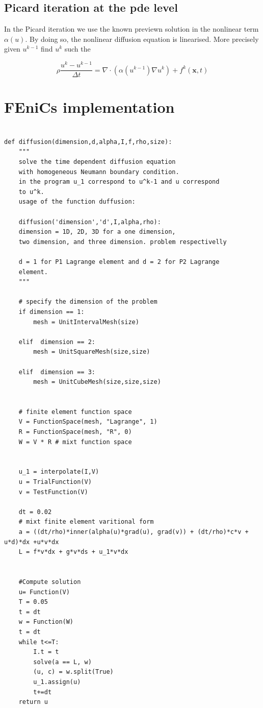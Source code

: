 \documentclass[10pt,a4paper]{report}
\begin{document}
\subsection{Picard iteration at the pde level}
In the Picard iteration we use the known previewn solution in the nonlinear term $\alpha (u)$. By doing so, the nonlinear diffusion equation is linearised. More precisely given $u^{k-1}$ find $u^{k}$ such the 


\begin{equation}\label{spatialp}
\rho\frac{u^{k}-u^{k-1}}{\Delta t} = \nabla\cdot(\alpha (u^{k-1})\nabla u^{k}) + f^{k}(\textbf{x},t)
\end{equation}

\clearpage
\section{FEniCs implementation}

\begin{lstlisting}

def diffusion(dimension,d,alpha,I,f,rho,size):
    """
    solve the time dependent diffusion equation
    with homogeneous Neumann boundary condition.
    in the program u_1 correspond to u^k-1 and u correspond
    to u^k.
    usage of the function duffusion:
    
    diffusion('dimension','d',I,alpha,rho):
    dimension = 1D, 2D, 3D for a one dimension,
    two dimension, and three dimension. problem respectivelly 
    
    d = 1 for P1 Lagrange element and d = 2 for P2 Lagrange 
    element.
    """
    
    # specify the dimension of the problem
    if dimension == 1:
        mesh = UnitIntervalMesh(size)
    
    elif  dimension == 2:
        mesh = UnitSquareMesh(size,size)
        
    elif  dimension == 3:
        mesh = UnitCubeMesh(size,size,size)
        
    
    # finite element function space
    V = FunctionSpace(mesh, "Lagrange", 1)
    R = FunctionSpace(mesh, "R", 0)
    W = V * R # mixt function space
    
    
    u_1 = interpolate(I,V)
    u = TrialFunction(V)
    v = TestFunction(V)
    
    dt = 0.02
    # mixt finite element varitional form
    a = ((dt/rho)*inner(alpha(u)*grad(u), grad(v)) + (dt/rho)*c*v + u*d)*dx +u*v*dx
    L = f*v*dx + g*v*ds + u_1*v*dx
   
    
    #Compute solution
    u= Function(V)
    T = 0.05
    t = dt
   	w = Function(W)
    t = dt
    while t<=T:
        I.t = t
        solve(a == L, w)
        (u, c) = w.split(True)
        u_1.assign(u)
        t+=dt
    return u

\end{lstlisting}
\end{document}
